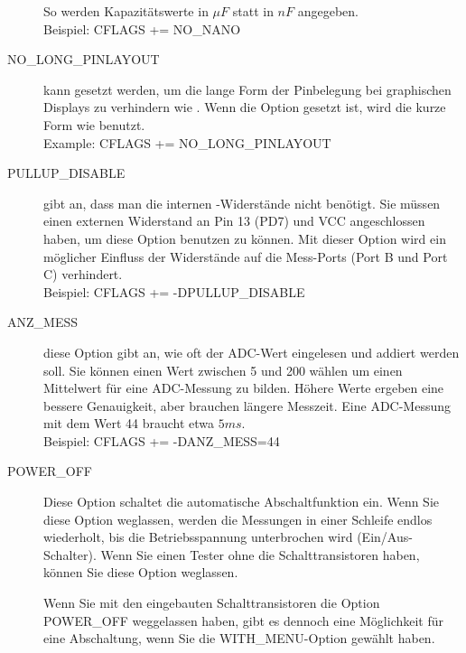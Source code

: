 \begin{description}
So werden Kapazitätswerte in \(\mu F\) statt in \(nF\) angegeben.\\
Beispiel: CFLAGS += NO\_NANO
  \item[NO\_LONG\_PINLAYOUT] kann gesetzt werden, um die lange Form der Pinbelegung bei graphischen Displays zu verhindern
wie .
Wenn die Option gesetzt ist, wird die kurze Form wie  benutzt.\\
Example: CFLAGS += NO\_LONG\_PINLAYOUT
  \item[PULLUP\_DISABLE] gibt an, dass man die internen -Widerstände nicht benötigt.
Sie müssen einen externen  Widerstand an Pin 13 (PD7) und VCC angeschlossen haben, um diese
Option benutzen zu können.
Mit dieser Option wird ein möglicher Einfluss der  Widerstände auf die Mess-Ports (Port B und Port C) verhindert.\\
Beispiel: CFLAGS += -DPULLUP\_DISABLE

  \item[ANZ\_MESS] diese Option gibt an, wie oft der ADC-Wert eingelesen und addiert werden soll.
Sie können einen Wert zwischen 5 und 200 wählen um einen Mittelwert für eine ADC-Messung zu bilden.
Höhere Werte ergeben eine bessere Genauigkeit, aber brauchen längere Messzeit.
Eine ADC-Messung mit dem Wert 44 braucht etwa \(5ms\).\\
Beispiel: CFLAGS += -DANZ\_MESS=44

  \item[POWER\_OFF] Diese Option schaltet die automatische Abschaltfunktion ein.
Wenn Sie diese Option weglassen, werden die Messungen in einer Schleife endlos wiederholt, bis die Betriebsspannung 
unterbrochen wird (Ein/Aus-Schalter).
Wenn Sie einen Tester ohne die Schalttransistoren haben, können Sie diese Option weglassen.

Wenn Sie mit den eingebauten Schalttransistoren die Option POWER\_OFF weggelassen haben,
gibt es dennoch eine Möglichkeit für eine Abschaltung, wenn Sie die WITH\_MENU-Option gewählt haben.


\end{description}
